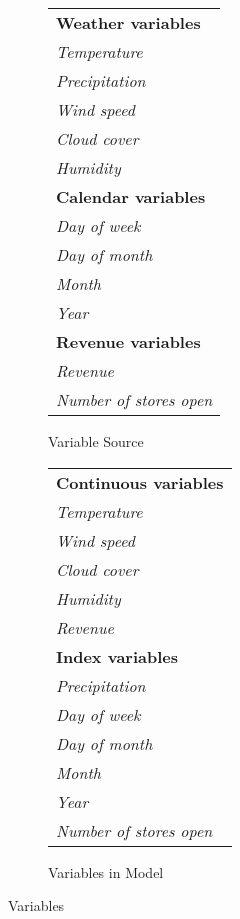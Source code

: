 \begin{figure}[h!]
    \begin{subfigure}{0.5\textwidth}
      \centering
      \caption{Variable Source}
      \label{fig:vars1}
      \begin{tabular}{l}
          \toprule 
          \textbf{Weather variables} \\
          \quad\textit{Temperature} \\
          \quad\textit{Precipitation} \\
          \quad\textit{Wind speed} \\
          \quad\textit{Cloud cover} \\
          \quad\textit{Humidity} \\[0.3em]
          \textbf{Calendar variables} \\
          \quad\textit{Day of week} \\
          \quad\textit{Day of month} \\
          \quad\textit{Month} \\
          \quad\textit{Year} \\[0.3em]
          \textbf{Revenue variables} \\
          \quad\textit{Revenue} \\
          \quad\textit{Number of stores open} \\[0.3em]
          \bottomrule
      \end{tabular}
    \end{subfigure}%
    \begin{subfigure}{0.5\textwidth}
      \centering
      \caption{Variables in Model}
      \label{fig:vars2}
      \begin{tabular}{l}
          \toprule 
          \textbf{Continuous variables} \\
          \quad\textit{Temperature} \\
          \quad\textit{Wind speed} \\
          \quad\textit{Cloud cover} \\
          \quad\textit{Humidity} \\
          \quad\textit{Revenue} \\[0.3em]
          \textbf{Index variables} \\
          \quad\textit{Precipitation} \\
          \quad\textit{Day of week} \\
          \quad\textit{Day of month} \\
          \quad\textit{Month} \\
          \quad\textit{Year} \\
          \quad\textit{Number of stores open} \\[0.3em]
          \bottomrule
      \end{tabular}
    \end{subfigure}%
    \caption{Variables}
    \label{fig:variables}
\end{figure}

